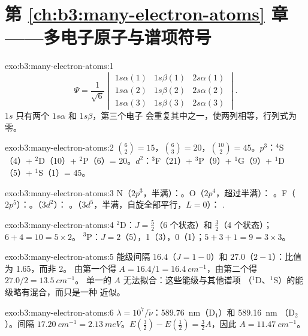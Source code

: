 \section*{第 \ref{ch:b3:many-electron-atoms} 章——多电子原子与谱项符号}

\begin{solution}{exo:b3:many-electron-atoms:1}
\[
\Psi = \frac{1}{\sqrt6}\begin{vmatrix}1s\alpha(1) & 1s\beta(1) & 2s\alpha(1)\\
1s\alpha(2) & 1s\beta(2) & 2s\alpha(2)\\ 1s\alpha(3) & 1s\beta(3) & 2s\alpha(3)
\end{vmatrix}.
\]
$1s$ 只有两个 $1s\alpha$ 和 $1s\beta$，第三个电子
会重复其中之一，使两列相等，行列式为零。
\end{solution}

\begin{solution}{exo:b3:many-electron-atoms:2}
$\binom62 = 15$，$\binom63 = 20$，$\binom{10}{2} = 45$。$p^3$：${}^4$S（4）+
${}^2$D（10）+ ${}^2$P（6）= 20。$d^2$：${}^3$F（21）+ ${}^3$P（9）+ ${}^1$G（9）+
${}^1$D（5）+ ${}^1$S（1）= 45。
\end{solution}

\begin{solution}{exo:b3:many-electron-atoms:3}
N（$2p^3$，半满）：。O（$2p^4$，超过半满）：
。F（$2p^5$）：。（$3d^2$）：
。（$3d^5$，半满，自旋全部平行，$L = 0$）：
.
\end{solution}

\begin{solution}{exo:b3:many-electron-atoms:4}
${}^2$D：$J = \frac52$（6 个状态）和 $\frac32$（4 个状态）；$6 + 4 = 10 = 5 \times 2$。
${}^3$P：$J = 2$（5），1（3），0（1）；$5 + 3 + 1 = 9 = 3 \times 3$。
\end{solution}

\begin{solution}{exo:b3:many-electron-atoms:5}
能级间隔 $16.4$（$J = 1 - 0$）和 $27.0$（$2 - 1$）：比值为 1.65，而非 2。
由第一个得 $A = 16.4/1 = \qty{16.4}{cm^{-1}}$，由第二个得 $27.0/2 = \qty{13.5}{cm^{-1}}$。
单一的 $A$ 无法拟合：这些能级与其他谱项
（${}^1$D、${}^1$S）的能级略有混合，而只是一种
近似。
\end{solution}

\begin{solution}{exo:b3:many-electron-atoms:6}
$\lambda = 10^7/\tilde\nu$：\qty{589.76}{nm}（D$_1$）和 \qty{589.16}{nm}
（D$_2$）。间隔 $\qty{17.20}{cm^{-1}} = \qty{2.13}{meV}$。$E(\frac32) -
E(\frac12) = \frac32A$，因此 $A = \qty{11.47}{cm^{-1}}$。
\end{solution}

